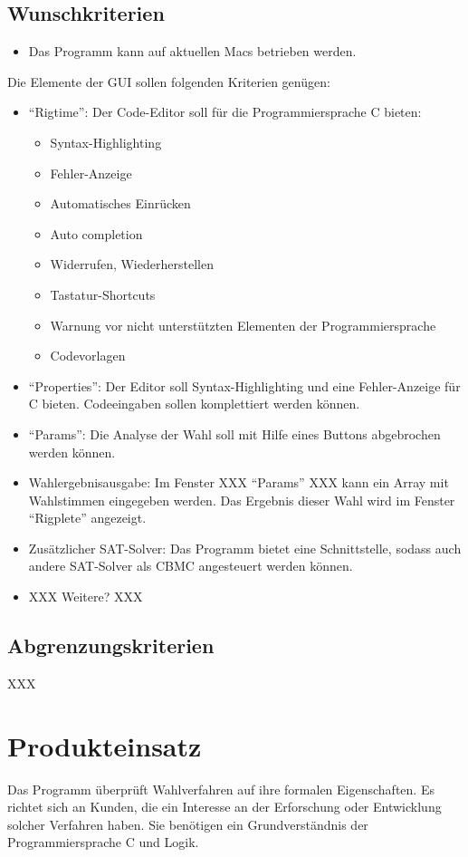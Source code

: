 \documentclass[a4paper]{scrreprt}
\begin{document}
\section{Wunschkriterien}
\begin{itemize}
\item Das Programm kann auf aktuellen Macs betrieben werden.
\end{itemize}
Die Elemente der GUI sollen folgenden Kriterien genügen:
\begin{itemize}
\item "`Rigtime"': Der Code-Editor soll für die Programmiersprache C bieten:
\begin{itemize} 
\item Syntax-Highlighting \item Fehler-Anzeige \item Automatisches Einrücken \item Auto completion \item Widerrufen, Wiederherstellen \item Tastatur-Shortcuts
\item Warnung vor nicht unterstützten Elementen der Programmiersprache \item Codevorlagen
\end{itemize}
\item "`Properties"': Der Editor soll Syntax-Highlighting und eine Fehler-Anzeige für C bieten. Codeeingaben sollen komplettiert werden können.
\item "`Params"': Die Analyse der Wahl soll mit Hilfe eines Buttons abgebrochen werden können.
\item Wahlergebnisausgabe: Im Fenster XXX "`Params"' XXX kann ein Array mit Wahlstimmen eingegeben werden. Das Ergebnis dieser Wahl wird im Fenster "`Rigplete"' angezeigt.
\item Zusätzlicher SAT-Solver: Das Programm bietet eine Schnittstelle, sodass auch andere SAT-Solver als CBMC angesteuert werden können.
\item XXX Weitere? XXX
\end{itemize}

\section{Abgrenzungskriterien}
XXX


\chapter{Produkteinsatz}
Das Programm überprüft Wahlverfahren auf ihre formalen Eigenschaften. Es richtet sich an Kunden, die ein Interesse an der Erforschung oder Entwicklung solcher Verfahren haben. Sie benötigen ein Grundverständnis der Programmiersprache C und Logik.
\end{document}
